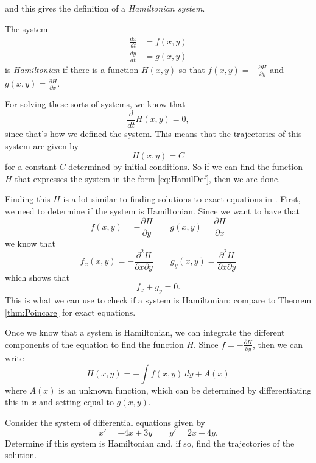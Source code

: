 \documentclass{ximera}
\begin{document}
and this gives the definition of a \emph{Hamiltonian system}. 

\begin{definition}
    The system
    \begin{equation}
        \begin{split}
            \frac{dx}{dt} &=f(x,y) \\
            \frac{dy}{dt} &= g(x,y)
        \end{split}
    \end{equation} 
    is \emph{Hamiltonian} if there is a function $H(x,y)$ so that $f(x,y) = -\frac{\partial H}{\partial y}$ and $g(x,y) = \frac{\partial H}{\partial x}$. 
\end{definition}

For solving these sorts of systems, we know that 
\[ 
    \frac{d}{dt}H(x,y) = 0, 
\]
since that's how we defined the system. This means that the trajectories of this system are given by
\[ 
    H(x,y) = C 
\] 
for a constant $C$ determined by initial conditions. So if we can find the function $H$ that expresses the system in the form \eqref{eq:HamilDef}, then we are done.

Finding this $H$ is a lot similar to finding solutions to exact equations in . First, we need to determine if the system is Hamiltonian. Since we want to have that
\[ 
    f(x,y) = -\frac{\partial H}{\partial y} \qquad g(x,y) = \frac{\partial H}{\partial x} 
\]
we know that
\[ 
    f_x(x,y) = -\frac{\partial^2 H}{\partial x \partial y} \qquad g_y(x,y) = \frac{\partial^2 H}{\partial x \partial y} 
\] 
which shows that
\[ 
    f_x + g_y = 0. 
\] 
This is what we can use to check if a system is Hamiltonian; compare to Theorem \ref{thm:Poincare} for exact equations.

Once we know that a system is Hamiltonian, we can integrate the different components of the equation to find the function $H$. Since $f = -\frac{\partial H}{\partial y}$, then we can write
\[ 
    H(x,y) = -\int f(x,y)\ dy + A(x) 
\] 
where $A(x)$ is an unknown function, which can be determined by differentiating this in $x$ and setting equal to $g(x,y)$.

\begin{example}
    Consider the system of differential equations given by
    \[ 
        x' = -4x + 3y \qquad y' = 2x + 4y. 
    \]
    Determine if this system is Hamiltonian and, if so, find the trajectories of the solution.
\end{example}
\end{document}
